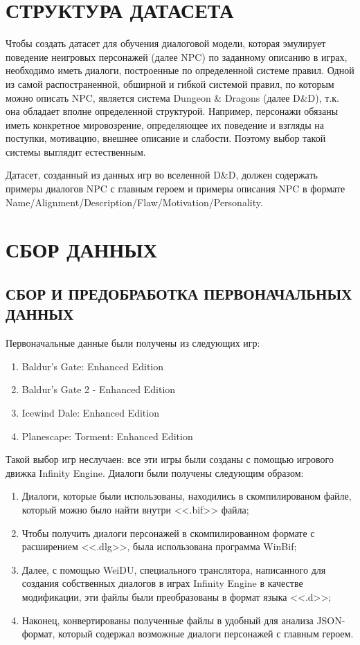 \section{СТРУКТУРА ДАТАСЕТА}
Чтобы создать датасет для обучения диалоговой модели, которая эмулирует поведение  неигровых персонажей (далее NPC) по заданному описанию в играх, необходимо иметь диалоги, построенные по определенной системе правил. Одной из самой распостраненной, обширной и гибкой системой правил, по которым можно описать NPC, является система Dungeon \& Dragons (далее D\&D), т.к. она обладает вполне определенной структурой. Например, персонажи обязаны иметь конкретное мировозрение, определяющее их поведение и взгляды на поступки, мотивацию, внешнее описание и слабости. Поэтому выбор такой системы выглядит естественным. 

Датасет, созданный из данных игр во вселенной D\&D, должен содержать примеры диалогов NPC с главным героем и примеры описания NPC в формате Name/Alignment/Description/Flaw/Motivation/Personality.

\section{СБОР ДАННЫХ}
\subsection{СБОР И ПРЕДОБРАБОТКА ПЕРВОНАЧАЛЬНЫХ ДАННЫХ}
Первоначальные данные были получены из следующих игр: 
\begin{enumerate}
    \item Baldur's Gate: Enhanced Edition
    \item Baldur's Gate 2 - Enhanced Edition
    \item Icewind Dale: Enhanced Edition
    \item Planescape: Torment: Enhanced Edition
\end{enumerate}

Такой выбор игр неслучаен: все эти игры были созданы с помощью 
игрового движка Infinity Engine. Диалоги были получены следующим образом:
\begin{enumerate}
    \item Диалоги, которые были использованы, находились в скомпилированом файле, который можно было найти внутри <<.bif>> файла;
    \item Чтобы получить диалоги персонажей в скомпилированном формате с расширением <<.dlg>>,
          была использована программа WinBif;
    \item Далее, с помощью WeiDU, специального транслятора,
          написанного для создания собственных диалогов в играх Infinity Engine в качестве модификации, 
          эти файлы были преобразованы в формат языка <<.d>>; 
    \item Наконец, конвертированы полученные файлы в удобный для анализа JSON-формат,
          который содержал возможные диалоги персонажей с главным героем.
\end{enumerate}

